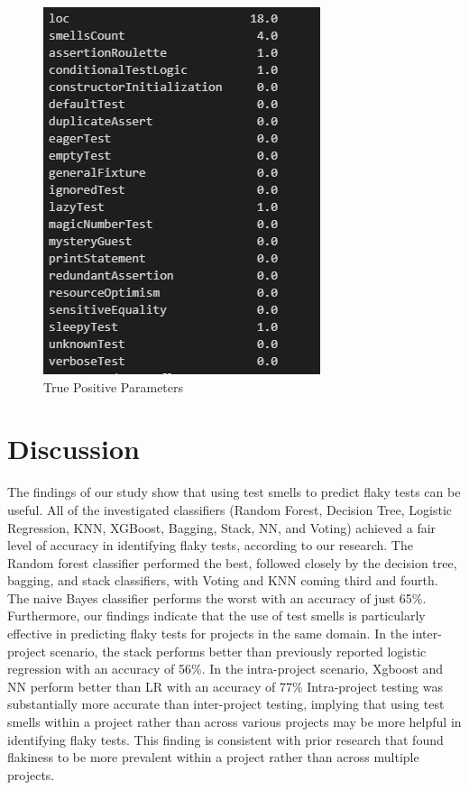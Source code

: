 \documentclass[sigconf,review]{acmart}
\begin{document}
\begin{figure}
    \centering
    \includegraphics[scale=0.3]{ConfusionMatrix/tppara.png}
    \caption{True Positive Parameters}
    \label{fig:my_label}
\end{figure}


 \section{Discussion}
 \label{Section:Discussion}
 The findings of our study show that using test smells to predict flaky tests can be useful. All of the investigated classifiers (Random Forest, Decision Tree, Logistic Regression, KNN, XGBoost, Bagging, Stack, NN, and Voting) achieved a fair level of accuracy in identifying flaky tests, according to our research. The Random forest classifier performed the best, followed closely by the decision tree, bagging, and stack  classifiers, with Voting and KNN coming third and fourth. The naive Bayes classifier performs the worst with an accuracy of just 65\%. Furthermore, our findings indicate that the use of test smells is particularly effective in predicting flaky tests for projects in the same domain. In the inter-project scenario, the stack performs better than previously reported logistic regression with an accuracy of 56\%. In the intra-project scenario, Xgboost and NN perform better than LR with an accuracy of 77\% Intra-project testing was substantially more accurate than inter-project testing, implying that using test smells within a project rather than across various projects may be more helpful in identifying flaky tests. This finding is consistent with prior research that found flakiness to be more prevalent within a project rather than across multiple projects.
 \\
\end{document}
